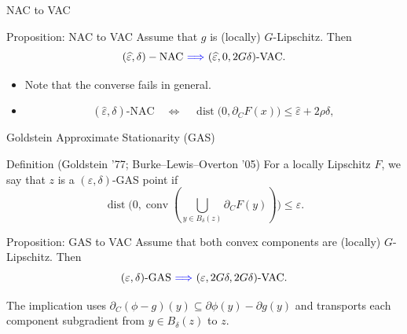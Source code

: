 \documentclass[10pt]{beamer}
\newcommand{\cref}[1]{{\color{blue}\footnotesize [#1]}}
\begin{document}
\begin{frame}{NAC to VAC}
\begin{block}{Proposition: NAC to VAC}
Assume that $g$ is (locally) $G$-Lipschitz. Then
\[
    (\widehat\varepsilon,\delta)-\text{NAC}
    \ \blue{\Longrightarrow}\ 
    {(\widehat\varepsilon,0, 2G\delta)\text{-VAC}}.
\]
\end{block}


\begin{itemize}
    \item Note that the converse fails in general.
    \item {}
\[
(\widehat\varepsilon,\delta)\text{-NAC}
    \quad\Longleftrightarrow\quad
    \operatorname{dist}\bigl(0,\partial_C F(x)\bigr)
    \le
    \widehat\varepsilon+2\rho\delta,
\]
\end{itemize}

\end{frame}

\begin{frame}{Goldstein Approximate Stationarity (GAS)}
\small
\vspace{0.15cm}
\setlength{\abovedisplayskip}{2pt}
\setlength{\belowdisplayskip}{2pt}
\begin{block}{Definition (Goldstein '77; Burke--Lewis--Overton '05)}
For a locally Lipschitz $F$, we say that $z$ is a $(\varepsilon,\delta)$-GAS point if
\[
\operatorname{dist}\bigl(0,\operatorname{conv}\!\left(\bigcup_{y\in B_\delta(z)}
    \partial_C F(y)\right)\bigr)
    \le\varepsilon.
\]
\end{block}


\medskip
\begin{block}{Proposition: GAS to VAC}
Assume that both convex components are (locally) $G$-Lipschitz. Then
\[
    (\varepsilon,\delta)\text{-GAS}
    \ \blue{\Longrightarrow}\ 
    {(\varepsilon,2G\delta,2G\delta)\text{-VAC}}.
\]
\end{block}

\vspace{-2pt}
{\footnotesize The implication uses
$\partial_C(\phi-g)(y)\subseteq\partial\phi(y)-\partial g(y)$ and
transports each component subgradient from $y\in B_\delta(z)$ to $z$.}


\end{frame}
\end{document}
